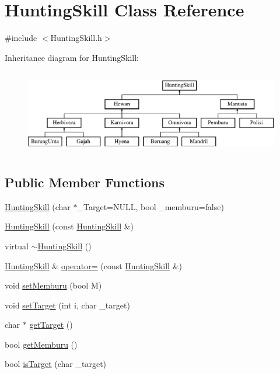 \hypertarget{class_hunting_skill}{}\section{Hunting\+Skill Class Reference}
\label{class_hunting_skill}


{\ttfamily \#include $<$Hunting\+Skill.\+h$>$}

Inheritance diagram for Hunting\+Skill\+:\begin{figure}[H]
\begin{center}
\leavevmode
\includegraphics[height=3.720930cm]{class_hunting_skill}
\end{center}
\end{figure}
\subsection*{Public Member Functions}
\begin{DoxyCompactItemize}
\item 
\hyperlink{class_hunting_skill_a6c3ca4ba2dd4f4c9cf1302088d362a6e}{Hunting\+Skill} (char $\ast$\+\_\+\+Target=N\+U\+LL, bool \+\_\+memburu=false)
\item 
\hyperlink{class_hunting_skill_a8817bc85912e00b4b431a94f32ee494e}{Hunting\+Skill} (const \hyperlink{class_hunting_skill}{Hunting\+Skill} \&)
\item 
virtual \hyperlink{class_hunting_skill_a648756f16fda66f2c68ab036dda97640}{$\sim$\+Hunting\+Skill} ()
\item 
\hyperlink{class_hunting_skill}{Hunting\+Skill} \& \hyperlink{class_hunting_skill_abd3b1e20a12499d97eb24f428be09d2d}{operator=} (const \hyperlink{class_hunting_skill}{Hunting\+Skill} \&)
\item 
void \hyperlink{class_hunting_skill_a9e00e9c4f2548ab4d25acb513625e364}{set\+Memburu} (bool M)
\item 
void \hyperlink{class_hunting_skill_a8616332156a56e69a9f274b296476d93}{set\+Target} (int i, char \+\_\+target)
\item 
char $\ast$ \hyperlink{class_hunting_skill_ace96396eca2bb39cddd326c2dc22243c}{get\+Target} ()
\item 
bool \hyperlink{class_hunting_skill_a1556fa4584ab19e2887e448fe5f6d34f}{get\+Memburu} ()
\item 
bool \hyperlink{class_hunting_skill_ae93d7a11c38d407d4587ef36fab47b7f}{is\+Target} (char \+\_\+target)
\end{DoxyCompactItemize}


